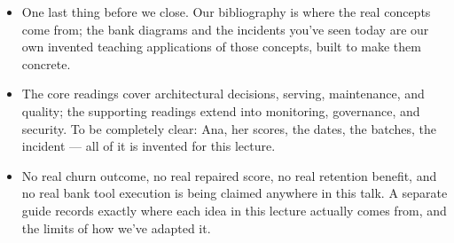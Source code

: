 \documentclass[11pt,a4paper]{article}
\begin{document}
\begin{examplebox}[title after break={SPOKEN SCRIPT --- slide 54 continued}]
\begin{itemize}
\item One last thing before we close. Our bibliography is where the real concepts come from; the bank diagrams and the incidents you've seen today are our own invented teaching applications of those concepts, built to make them concrete.
\item The core readings cover architectural decisions, serving, maintenance, and quality; the supporting readings extend into monitoring, governance, and security. To be completely clear: Ana, her scores, the dates, the batches, the incident — all of it is invented for this lecture.
\item No real churn outcome, no real repaired score, no real retention benefit, and no real bank tool execution is being claimed anywhere in this talk. A separate guide records exactly where each idea in this lecture actually comes from, and the limits of how we've adapted it.
\end{itemize}
\end{examplebox}
\par\noindent{\scriptsize\textcolor{teal!60!black}{Reading anchor: See SOURCES.md and presenter guide}}
\clearpage
\end{document}
